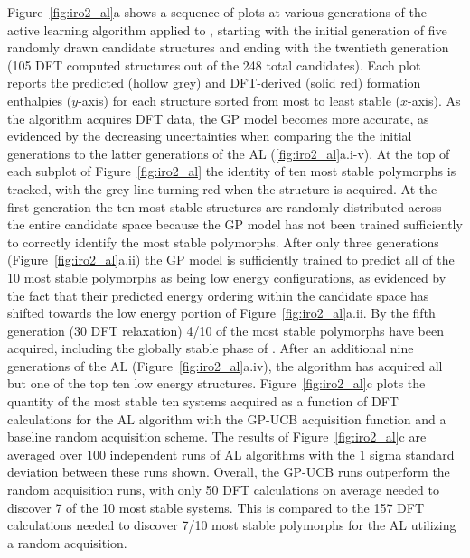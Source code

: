 %
Figure~\ref{fig:iro2_al}a shows a sequence of plots at various generations of the active learning algorithm applied to \IrOthree,
starting with the initial generation of five randomly drawn candidate structures and ending with the twentieth generation
(\num{105} DFT computed structures out of the \num{248} total candidates).
%
Each plot reports the predicted (hollow grey) and DFT-derived (solid red) formation enthalpies ($y$-axis) for each structure sorted from most to least stable ($x$-axis).
%
As the algorithm acquires DFT data, the GP model becomes more accurate, as evidenced by the decreasing uncertainties when comparing the the initial generations to the latter generations of the AL (\ref{fig:iro2_al}a.i-v).
%
At the top of each subplot of Figure~\ref{fig:iro2_al} the identity of ten most stable polymorphs is tracked,
with the grey line turning red when the structure is acquired.
%
At the first generation the ten most stable structures are randomly distributed across the entire candidate space because the GP model has not been trained sufficiently to correctly identify the most stable polymorphs.
%
After only three generations (Figure~\ref{fig:iro2_al}a.ii) the GP model is sufficiently trained to predict all of the 10 most stable polymorphs as being low energy configurations, as evidenced by the fact that their predicted energy ordering within the candidate space has shifted towards the low energy portion of Figure~\ref{fig:iro2_al}a.ii.
%
By the fifth generation (\num{30} DFT relaxation) \num{4/10} of the most stable polymorphs have been acquired,
including the globally stable phase of \IrOthree.
%
After an additional nine generations of the AL
(Figure~\ref{fig:iro2_al}a.iv),
the algorithm has acquired all but one of the top ten low energy structures.
%
%
Figure~\ref{fig:iro2_al}c plots the quantity of the most stable ten systems acquired as a function of DFT calculations for the AL algorithm with the GP-UCB acquisition function and a baseline random acquisition scheme.
%
The results of Figure~\ref{fig:iro2_al}c are averaged over 100 independent runs of AL algorithms with the 1 sigma standard deviation between these runs shown.
%
Overall, the GP-UCB runs outperform the random acquisition runs, with only \num{50} DFT calculations on average needed to discover \num{7} of the \num{10} most stable systems.
%
This is compared to the \num{157} DFT calculations needed to discover \num{7/10} most stable polymorphs for the AL utilizing a random acquisition.


